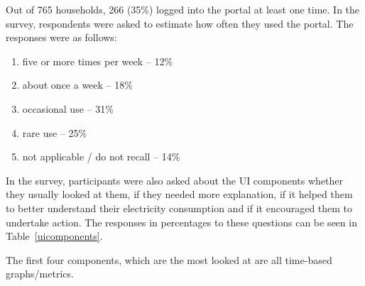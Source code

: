 \documentclass[journal]{vgtc}                %
\begin{document}
Out of 765 households, 266 (35\%) logged into the portal at least one time. In the survey, respondents were asked to estimate how often they used the portal. The responses were as follows:
\begin{enumerate}
\item five or more times per week -- 12\%
\item about once a week -- 18\%
\item occasional use -- 31\%
\item rare use -- 25\%
\item not applicable / do not recall -- 14\%
\end{enumerate}

In the survey, participants were also asked about the UI components whether they usually looked at them, if they needed more explanation, if it helped them to better understand their electricity consumption and if it encouraged them to undertake action. The responses in percentages to these questions can be seen in Table~\ref{uicomponents}. %

The first four components, which are the most looked at are all time-based graphs/metrics. 
\end{document}
